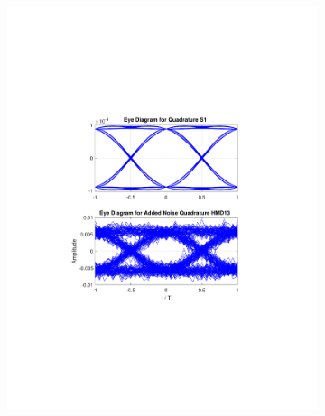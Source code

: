 \begin{refsection}
\begin{figure}[H]
\begin{minipage}{\linewidth}
\begin{subfigure}{.45\textwidth}
		\includegraphics[clip, trim=5cm 7cm 5cm 7cm, width=\textwidth]{./sdf/m_qam_system/figures/eyes/q_n_nmf_45_60_rc_09.pdf}
	\end{subfigure}
	

\end{minipage}
\end{figure}
\end{refsection}
